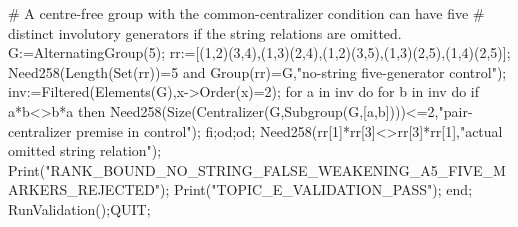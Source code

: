 \documentclass[11pt,a4paper]{article}
\begin{document}
\begin{CompleteProgram}
 # A centre-free group with the common-centralizer condition can have five
 # distinct involutory generators if the string relations are omitted.
 G:=AlternatingGroup(5);
 rr:=[(1,2)(3,4),(1,3)(2,4),(1,2)(3,5),(1,3)(2,5),(1,4)(2,5)];
 Need258(Length(Set(rr))=5 and Group(rr)=G,"no-string five-generator control");
 inv:=Filtered(Elements(G),x->Order(x)=2);
 for a in inv do for b in inv do if a*b<>b*a then
 Need258(Size(Centralizer(G,Subgroup(G,[a,b])))<=2,"pair-centralizer premise in control");
 fi;od;od;
 Need258(rr[1]*rr[3]<>rr[3]*rr[1],"actual omitted string relation");
 Print("RANK_BOUND_NO_STRING_FALSE_WEAKENING_A5_FIVE_MARKERS_REJECTED\n");
 Print("TOPIC_E_VALIDATION_PASS\n");
end;
RunValidation();QUIT;
\end{CompleteProgram}
\end{document}
